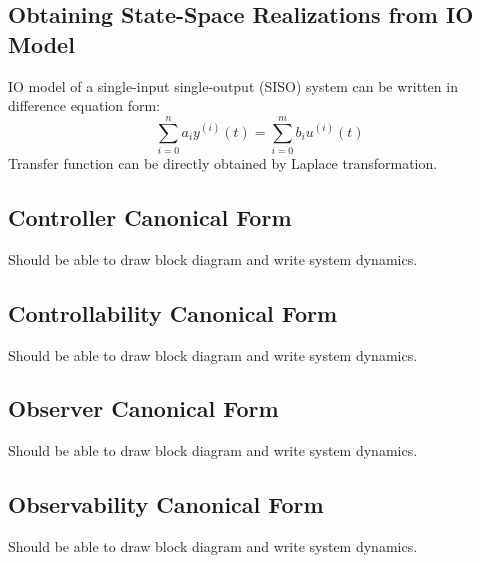 \documentclass[10pt,a4paper,oneside]{article}
\begin{document}
\subsection{Obtaining State-Space Realizations from IO Model}
IO model of a single-input single-output (SISO) system can be written in difference equation form:
\[
\sum_{i=0}^{n} a_i y^{(i)}(t) = \sum_{i=0}^{m} b_i u^{(i)}(t)
\]
Transfer function can be directly obtained by Laplace transformation.

\subsection{Controller Canonical Form}
Should be able to draw block diagram and write system dynamics.

\subsection{Controllability Canonical Form}
Should be able to draw block diagram and write system dynamics.

\subsection{Observer Canonical Form}
Should be able to draw block diagram and write system dynamics.

\subsection{Observability Canonical Form}
Should be able to draw block diagram and write system dynamics.
\end{document}
